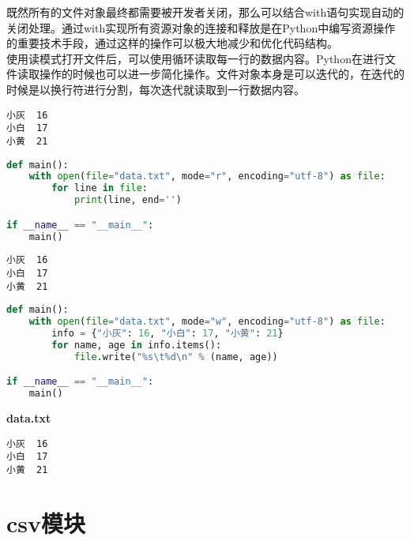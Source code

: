 既然所有的文件对象最终都需要被开发者关闭，那么可以结合with语句实现自动的关闭处理。通过with实现所有资源对象的连接和释放是在Python中编写资源操作的重要技术手段，通过这样的操作可以极大地减少和优化代码结构。\\

使用读模式打开文件后，可以使用循环读取每一行的数据内容。Python在进行文件读取操作的时候也可以进一步简化操作。文件对象本身是可以迭代的，在迭代的时候是以换行符进行分割，每次迭代就读取到一行数据内容。\\


\begin{lstlisting}[title=data.txt]
小灰	16
小白	17
小黄	21
\end{lstlisting}

\begin{lstlisting}[language=Python, title=read\_file.py]
def main():
	with open(file="data.txt", mode="r", encoding="utf-8") as file:
		for line in file:
			print(line, end='')

if __name__ == "__main__":
	main()
\end{lstlisting}

\begin{tcolorbox}
	\begin{verbatim}
小灰	16
小白	17
小黄	21
\end{verbatim}
\end{tcolorbox}

\vspace{0.5cm}


\begin{lstlisting}[language=Python]
def main():
	with open(file="data.txt", mode="w", encoding="utf-8") as file:
		info = {"小灰": 16, "小白": 17, "小黄": 21}
		for name, age in info.items():
			file.write("%s\t%d\n" % (name, age))

if __name__ == "__main__":
	main()
\end{lstlisting}

\begin{tcolorbox}
	\textbf{data.txt}
	\begin{verbatim}
小灰	16
小白	17
小黄	21
\end{verbatim}
\end{tcolorbox}

\newpage

\section{csv模块}

